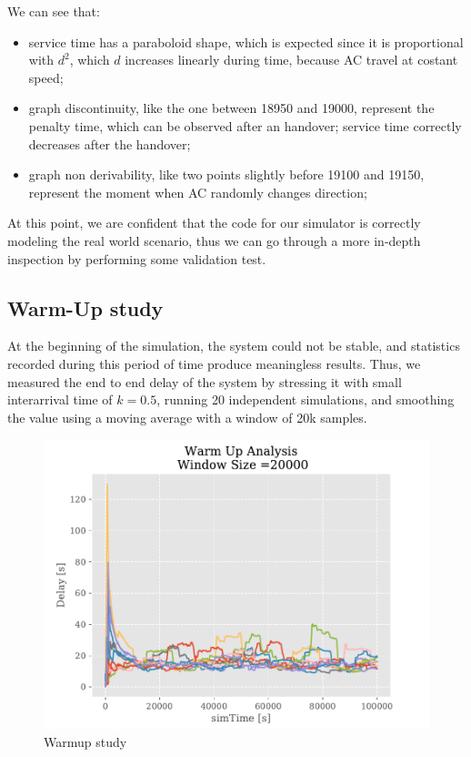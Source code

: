 \documentclass[a4paper,12pt]{article}
\begin{document}
We can see that:
\begin{itemize}
  \item service time has a paraboloid shape, which is expected since it is proportional with $d^2$, which $d$ increases linearly during time, because AC travel at costant speed;
  \item graph discontinuity, like the one between 18950 and 19000, represent the penalty time, which can be observed after an handover; service time correctly decreases after the handover;
  \item graph non derivability, like two points slightly before 19100 and 19150, represent the moment when AC randomly changes direction;
\end{itemize}

At this point, we are confident that the code for our simulator is correctly modeling the real world scenario, thus we can go through a more in-depth inspection by performing some validation test.

\subsection{Warm-Up study}
At the beginning of the simulation, the system could not be stable, and statistics recorded during this period of time produce meaningless results.
Thus, we measured the end to end delay of the system by stressing it with small interarrival time of $k=0.5$, running 20 independent simulations, and smoothing the value using a moving average with a window of 20k samples.

\begin{figure}[H]
  \centering
  \includegraphics[scale=0.6]{img/warmup-study.pdf}
  \caption{Warmup study}
  \label{fig:warmup-study}
\end{figure}
\end{document}
